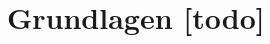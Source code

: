 \begin{comment}
------------------------------------------------------------------------------------------
\end{comment}
\chapter{Grundlagen [todo]}


\begin{comment}
------------------------------------------------------------------------------------------
- Der Überblick und Vergleich der verschiedenen Abstandsbestimmungsverfahren erfolgt über eine klassische Literatursuche, siehe \cite{herranz2010studying, zekavat2011handbook}.

	- TDoA, ToF, ToA, AoA, Signal Strength(SS), received signal strength (RSS) , OneWayRanging, TWR
- Wie lange dauert es bis eine Nachricht ausgetauscht worden ist?
	- Beispiel mit einer konkreten Entfernung?
- Wie schnell drifted ein Quarz in einem µc?
	- What is the ppm in the crystal oscillator?
	- https://electronics.stackexchange.com/questions/15851/what-is-the-ppm-in-the-crystal-oscillator
	
\cite{herranz2010studying}
	- Studying of WiFi range-only sensor and its application to localization and mapping systems
\cite{zekavat2011handbook}
	- Handbook of position location: Theory, practice and advances


\end{comment}
